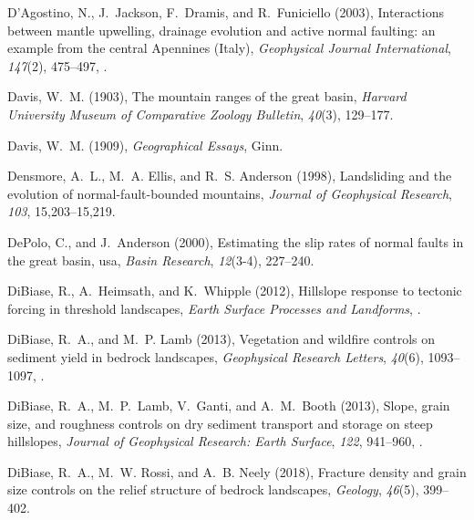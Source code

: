 \begin{thebibliography}{41}
D'Agostino, N., J.~Jackson, F.~Dramis, and R.~Funiciello (2003), {Interactions
  between mantle upwelling, drainage evolution and active normal faulting: an
  example from the central Apennines (Italy)}, \textit{Geophysical Journal
  International}, \textit{147}(2), 475--497,
  .

Davis, W.~M. (1903), The mountain ranges of the great basin, \textit{Harvard
  University Museum of Comparative Zoology Bulletin}, \textit{40}(3), 129--177.

Davis, W.~M. (1909), \textit{Geographical Essays}, Ginn.

Densmore, A.~L., M.~A. Ellis, and R.~S. Anderson (1998), Landsliding and the
  evolution of normal-fault-bounded mountains, \textit{Journal of Geophysical
  Research}, \textit{103}, 15,203--15,219.

DePolo, C., and J.~Anderson (2000), Estimating the slip rates of normal faults
  in the great basin, usa, \textit{Basin Research}, \textit{12}(3-4), 227--240.

DiBiase, R., A.~Heimsath, and K.~Whipple (2012), Hillslope response to tectonic
  forcing in threshold landscapes, \textit{Earth Surface Processes and
  Landforms}, .

DiBiase, R.~A., and M.~P. Lamb (2013), Vegetation and wildfire controls on
  sediment yield in bedrock landscapes, \textit{Geophysical Research Letters},
  \textit{40}(6), 1093--1097, .

DiBiase, R.~A., M.~P.~Lamb, V.~Ganti, and A.~M.~Booth (2013), Slope, grain size, and roughness controls on dry sediment transport and storage on steep hillslopes, \textit{Journal of Geophysical Research:
  Earth Surface},
  \textit{122}, 941--960, .

DiBiase, R.~A., M.~W. Rossi, and A.~B. Neely (2018), {Fracture density and grain size controls on the relief structure of bedrock landscapes},
  \textit{Geology},
  \textit{46}(5),
  399--402.


\end{thebibliography}
